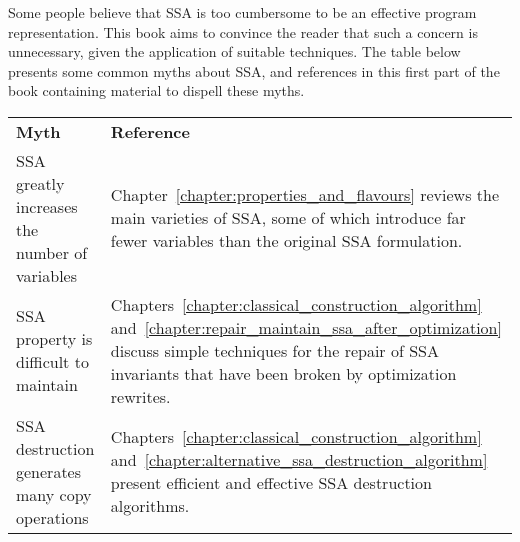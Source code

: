 Some people believe that SSA is too cumbersome to be an effective program representation. 
This book aims to convince the reader that such a concern is unnecessary, given the application of suitable techniques. 
The table below presents some common myths about SSA, and references in this first part of the book containing material to dispell these myths.

\begin{center}
\small
\begin{tabular}{p{}@{\kern.05\textwidth}@{\kern.05\textwidth}p{}}
  \hfil \textbf{Myth}\hfil & \hfil \textbf{Reference} \hfil \\[2ex]%
\hspace{.39\textwidth}\penalty0
SSA greatly increases the number of variables &
Chapter~\ref{chapter:properties_and_flavours} reviews the main varieties of
SSA, some of which introduce far fewer variables
than the original SSA formulation. \\ [1ex]
\hspace{.39\textwidth}\penalty0 SSA property is difficult to maintain & 
Chapters~\ref{chapter:classical_construction_algorithm} and~\ref{chapter:repair_maintain_ssa_after_optimization}  discuss simple techniques 
for the repair of SSA invariants that have been
broken by optimization rewrites.\\ [1ex]
SSA destruction generates many copy operations & 
Chapters~\ref{chapter:classical_construction_algorithm} and~\ref{chapter:alternative_ssa_destruction_algorithm} present efficient and effective SSA destruction algorithms. \\
\end{tabular}
\end{center}

